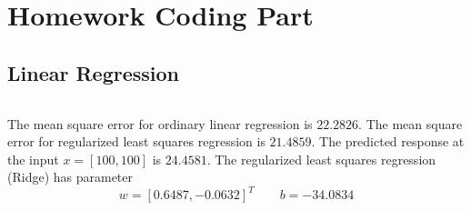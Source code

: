 \documentclass[12pt]{article}
\begin{document}
\section{Homework Coding Part}
\subsection{Linear Regression}
\inputminted[frame=single,framesep=10pt,linenos,xleftmargin=\parindent]{octave}{./hw3/problem1/Linear_regression.m}
The mean square error for ordinary linear regression is \(22.2826\).
The mean square error for regularized least squares regression is \(21.4859\).
The predicted response at the input \(x=[100, 100]\) is \(24.4581\).
The regularized least squares regression (Ridge) has parameter
\[ w=[ 0.6487, -0.0632]^T \hspace{2em} b=-34.0834 \]
\end{document}
